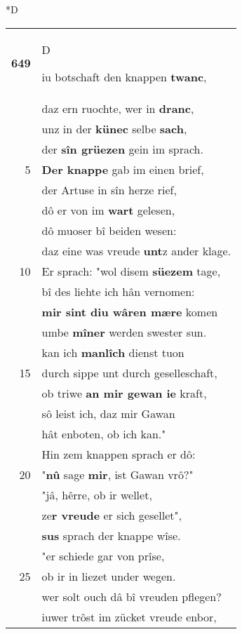 \documentclass[8pt,a4paper,notitlepage]{article}
\begin{document}
\begin{table}[ht]
\begin{minipage}[t]{0.5\linewidth}
\small
\begin{center}*D
\end{center}
\begin{tabular}{rl}
\textbf{649} & \begin{large}D\end{large}iu botschaft den knappen \textbf{twanc},\\ 
 & daz ern ruochte, wer in \textbf{dranc},\\ 
 & unz in der \textbf{künec} selbe \textbf{sach},\\ 
 & der \textbf{sîn grüezen} gein im sprach.\\ 
5 & \textbf{Der knappe} gab im einen brief,\\ 
 & der Artuse in sîn herze rief,\\ 
 & dô er von im \textbf{wart} gelesen,\\ 
 & dô muoser bî beiden wesen:\\ 
 & daz eine was vreude \textbf{unt}z ander klage.\\ 
10 & Er sprach: "wol disem \textbf{süezem} tage,\\ 
 & bî des liehte ich hân vernomen:\\ 
 & \textbf{mir sint diu wâren mære} komen\\ 
 & umbe \textbf{mîner} werden swester sun.\\ 
 & kan ich \textbf{manlîch} dienst tuon\\ 
15 & durch sippe unt durch geselleschaft,\\ 
 & ob triwe \textbf{an mir gewan ie} kraft,\\ 
 & sô leist ich, daz mir Gawan\\ 
 & hât enboten, ob ich kan."\\ 
 & Hin zem knappen sprach er dô:\\ 
20 & "\textbf{nû} sage \textbf{mir}, ist Gawan vrô?"\\ 
 & "jâ, hêrre, ob ir wellet,\\ 
 & ze\textbf{r vreude} er sich gesellet",\\ 
 & \textbf{sus} sprach der knappe wîse.\\ 
 & "er schiede gar von prîse,\\ 
25 & ob ir in liezet under wegen.\\ 
 & wer solt ouch dâ bî vreuden pflegen?\\ 
 & iuwer trôst im zücket vreude enbor,\\ 

\end{tabular}
\end{minipage}
\end{table}
\end{document}
